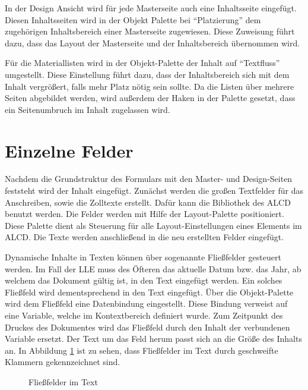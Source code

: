 {In der Design Ansicht wird für jede Masterseite auch eine Inhaltsseite eingefügt. Diesen Inhaltsseiten wird in der Objekt Palette bei "`Platzierung"' dem zugehörigen Inhaltsbereich einer Masterseite zugewiesen. Diese Zuweisung führt dazu, dass das Layout der Masterseite und der Inhaltsbereich übernommen wird.

Für die Materiallisten wird in der Objekt-Palette der Inhalt auf "`Textfluss"' umgestellt. Diese Einstellung führt dazu, dass der Inhaltsbereich sich mit dem Inhalt vergrößert, falls mehr Platz nötig sein sollte. Da die Listen über mehrere Seiten abgebildet werden, wird außerdem der Haken in der Palette gesetzt, dass ein Seitenumbruch im Inhalt zugelassen wird.




\FloatBarrier
\section{Einzelne Felder}

Nachdem die Grundstruktur des Formulars mit den Master- und Design-Seiten feststeht wird der Inhalt eingefügt.
Zunächst werden die großen Textfelder für das Anschreiben, sowie die Zolltexte erstellt. Dafür kann die Bibliothek des \ac{ALCD} benutzt werden. Die Felder werden mit Hilfe der Layout-Palette positioniert. Diese Palette dient als Steuerung für alle Layout-Einstellungen eines Elements im \ac{ALCD}. Die Texte werden anschließend in die neu erstellten Felder eingefügt. 

Dynamische Inhalte in Texten können über sogenannte Fließfelder gesteuert werden. Im Fall der \ac{LLE} muss des Öfteren das aktuelle Datum bzw. das Jahr, ab welchem das Dokument gültig ist, in den Text eingefügt werden.
Ein solches Fließfeld wird dementsprechend in den Text eingefügt. Über die Objekt-Palette wird dem Fließfeld eine Datenbindung eingestellt. Diese Bindung verweist auf eine Variable, welche im Kontextbereich definiert wurde. Zum Zeitpunkt des Druckes des Dokumentes wird das Fließfeld durch den Inhalt der verbundenen Variable ersetzt. Der Text um das Feld herum passt sich an die Größe des Inhalts an. In Abbildung \ref{figdt} ist zu sehen, dass Fließfelder im Text durch geschweifte Klammern gekennzeichnet sind.

\begin{figure}[ht]
	\centering
	\caption{Fließfelder im Text}
	\label{figdt}
	

\end{figure}}
